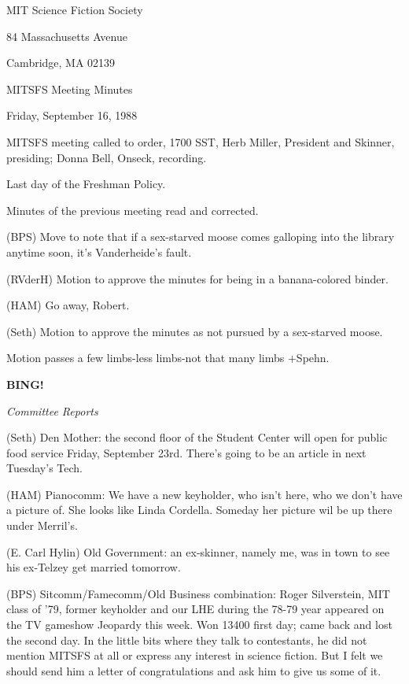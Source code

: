\documentclass[12pt]{article}
\newcommand{\bing}{{\bf BING!} }
\newcommand{\goto}[1]{\bing \vskip 12pt \centerline{{\em{#1}}}}
\begin{document}
\begin{center}

MIT Science Fiction Society 

84 Massachusetts Avenue

Cambridge, MA 02139

\vspace{12pt}

MITSFS Meeting Minutes 

Friday, September 16, 1988

\end{center}
 
\vspace{18pt}

\setlength{\parskip}{6pt}

\noindent
MITSFS meeting called to order, 1700 SST,
Herb Miller, President and Skinner, presiding; Donna Bell, Onseck, recording.

Last day of the Freshman Policy.

Minutes of the previous meeting read and corrected.

(BPS) Move to note that if a sex-starved moose comes galloping into the library anytime soon, it's Vanderheide's fault.

(RVderH) Motion to approve the minutes for being in a banana-colored binder.

(HAM) Go away, Robert.

(Seth) Motion to approve the minutes as not pursued by a sex-starved moose.

Motion passes a few limbs-less limbs-not that many limbs +Spehn.

\goto{Committee Reports}

(Seth) Den Mother: the second floor of the Student Center will open for public food service Friday, September 23rd. There's going to be an article in next Tuesday's Tech.

(HAM) Pianocomm: We have a new keyholder, who isn't here, who we don't have a picture of. She looks like Linda Cordella. Someday her picture wil be up there under Merril's.

(E. Carl Hylin) Old Government: an ex-skinner, namely me, was in town to see his ex-Telzey get married tomorrow.

(BPS) Sitcomm/Famecomm/Old Business combination: Roger Silverstein, MIT class of '79, former keyholder and our LHE during the 78-79 year appeared on the TV gameshow Jeopardy this week. Won 13400 first day; came back and lost the second day. In the little bits where they talk to contestants, he did not mention MITSFS at all or express any interest in science fiction. But I felt we should send him a letter of congratulations and ask him to give us some of it.
\end{document}
